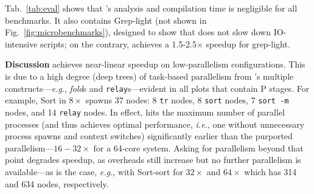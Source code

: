 \documentclass[letterpaper,twocolumn,10pt]{article}
\newcommand{\eg}{{\em e.g.}, }
\newcommand{\ie}{{\em i.e.}, }
\newcommand{\etc}{{\em etc.}\xspace}
\newcommand{\heading}[1]{\vspace{4pt}\noindent\textbf{#1}\enspace}
\newcommand{\ttt}[1]{\texttt{#1}}
\newcommand{\cn}[1]{\mbox{\textcircled{\footnotesize #1}}}
\newcommand{\pur}{\cn{\textsc{P}}\xspace}
\newcommand{\kk}[1]{[{\color{magenta}kk: #1}]}
\begin{document}
Tab.~\ref{tab:eval} shows that \sys's analysis and compilation time is negligible %
  for all benchmarks.
It also contains Grep-light (not shown in Fig.~\ref{fig:microbenchmarks}), designed to show that \sys does not slow down IO-intensive scripts;
  on the contrary, \sys achieves a 1.5-2.5$\times$ speedup for grep-light. 


\heading{Discussion}
\sys achieves near-linear speedup on low-parallelism configurations.
This is due to a high degree (deep trees) of task-based parallelism from \sys's multiple constructs---\eg \emph{fold}s and \ttt{relay}s---evident in all plots that contain \pur stages.
For example, Sort in $8\times$ spawns 37 nodes:
  8 \ttt{tr} nodes, 8 \ttt{sort} nodes, 7 \ttt{sort -m} nodes, and 14 \ttt{relay} nodes.
In effect, \sys hits the maximum number of parallel processes (and thus achieves optimal performance, \ie one without unnecessary process spawns and context switches) 
significantly earlier than the purported parallelism---$16-32\times$ for a 64-core system.
Asking for parallelism beyond that point degrades speedup, as overheads still increase but no further parallelism is available---as is the case, \eg  with Sort-sort for $32\times$ and $64\times$ which has 314 and 634 nodes, respectively.
% 

\end{document}
